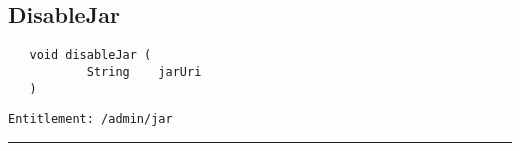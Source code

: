 \subsection{DisableJar}
\label{Api:DisableJar}
\begin{verbatim}
   void disableJar (
           String    jarUri
   )
\end{verbatim}
\begin{Verbatim}[fontsize=\small, formatcom=\color{Maroon}]
  Entitlement: /admin/jar
\end{Verbatim}



\rule{12cm}{2pt}
